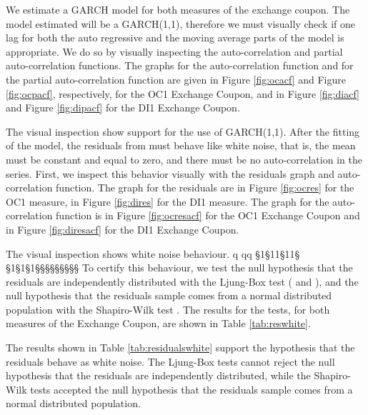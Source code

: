 \documentclass[cic,tc, english]{iiufrgs}
\begin{document}
    We estimate a GARCH model for both measures of the exchange coupon. The model estimated will be a GARCH(1,1), therefore we must visually check if one lag for both the auto regressive and the moving average parts of the model is appropriate. We do so by visually inspecting the auto-correlation and partial auto-correlation functions. The graphs for the auto-correlation function and for the partial auto-correlation function are given in Figure \ref{fig:ocacf} and Figure \ref{fig:ocpacf}, respectively, for the OC1 Exchange Coupon, and in Figure \ref{fig:diacf} and Figure \ref{fig:dipacf} for the DI1 Exchange Coupon.

    

    

    

    

    The visual inspection show support for the use of GARCH(1,1). After the fitting of the model, the residuals from must behave like white noise, that is, the mean must be constant and equal to zero, and there must be no auto-correlation in the series. First, we inspect this behavior visually with the residuals graph and auto-correlation function. The graph for the residuals are in Figure \ref{fig:ocres} for the OC1 measure, in Figure \ref{fig:dires} for the DI1 measure. The graph for the auto-correlation function is in Figure \ref{fig:ocresacf} for the OC1 Exchange Coupon and in Figure \ref{fig:diresacf} for the DI1 Exchange Coupon.

    

    

    

    

    The visual inspection shows white noise behaviour.      q   qq  §1§11§11§   §1§1§1§§§§§§§§§ To certify this behaviour, we test the null hypothesis that the residuals are independently distributed with the Ljung-Box test (\citet{boxpierce} and \citet{ljungbox}), and the null hypothesis that the residuals sample comes from a normal distributed population with the Shapiro-Wilk test \citet{shapirowilk}. The results for the tests, for both measures of the Exchange Coupon, are shown in Table \ref{tab:reswhite}.

    

    The results shown in Table \ref{tab:residualswhite} support the hypothesis that the residuals behave as white noise. The Ljung-Box tests cannot reject the null hypothesis that the residuals are independently distributed, while the Shapiro-Wilk tests accepted the null hypothesis that the residuals sample comes from a normal distributed population.
\end{document}
